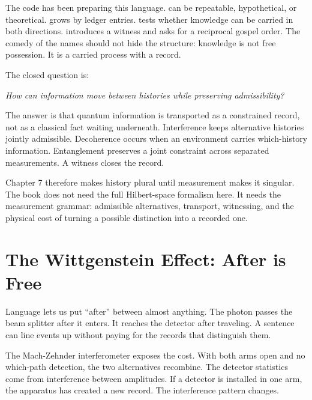 \begin{chapteressay}
The code has been preparing this language.  can be repeatable,
hypothetical, or theoretical.  grows by ledger entries.
 tests whether knowledge can be carried in both directions.
 introduces a witness and asks for a reciprocal gospel order.
The comedy of the names should not hide the structure: knowledge is not free
possession. It is a carried process with a record.

The closed question is:

\begin{center}
\emph{How can information move between histories while preserving
admissibility?}
\end{center}

The answer is that quantum information is transported as a constrained
record, not as a classical fact waiting underneath. Interference keeps
alternative histories jointly admissible. Decoherence occurs when an
environment carries which-history information. Entanglement preserves a joint
constraint across separated measurements. A witness closes the record.

Chapter 7 therefore makes history plural until measurement makes it singular.
The book does not need the full Hilbert-space formalism here. It needs the
measurement grammar: admissible alternatives, transport, witnessing, and the
physical cost of turning a possible distinction into a recorded one.

\end{chapteressay}


\section{The Wittgenstein Effect: After is Free}
\label{se:the-wittgenstein-effect}

Language lets us put ``after'' between almost anything. The photon passes the
beam splitter after it enters. It reaches the detector after traveling. A
sentence can line events up without paying for the records that distinguish
them.

The Mach-Zehnder interferometer exposes the cost. With both arms open and no
which-path detection, the two alternatives recombine. The detector statistics
come from interference between amplitudes. If a detector is installed in one
arm, the apparatus has created a new record. The interference pattern changes.

